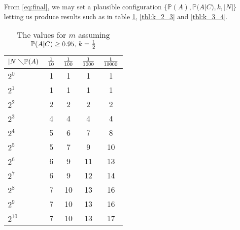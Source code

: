 \documentclass[11pt]{article}
\renewcommand{\P}{\mathbb{P}}
\begin{document}
    From \eqref{eq:final}, we may set a plausible configuration $\{\P(A),\P(A|C),k,|N|\}$ letting us
    produce results such as in table \ref{tbl:k_1_2}, \ref{tbl:k_2_3} and \ref{tbl:k_3_4}.

    \begin{table}[H]
        \centering
        \caption{The values for $m$ assuming $\P(A|C) \ge 0.95,\, k = {1 \over 2}$}
        \label{tbl:k_1_2}
        \begin{tabular}{lcccc}
            \toprule
            $|N| \diagdown \P(A)$ & ${1 \over 10 }$ & ${1 \over 100 }$ & ${1 \over 1000 }$ & ${1 \over 10000 }$\\
            \midrule
            $2^0$               & 1               & 1                & 1                 & 1\\
            $2^1$               & 1               & 1                & 1                 & 1\\
            $2^2$               & 2               & 2                & 2                 & 2\\
            $2^3$               & 4               & 4                & 4                 & 4\\
            $2^4$               & 5               & 6                & 7                 & 8\\
            $2^5$               & 5               & 7                & 9                 & 10\\
            $2^6$               & 6               & 9                & 11                & 13\\
            $2^7$               & 6               & 9                & 12                & 14\\
            $2^8$               & 7               & 10               & 13                & 16\\
            $2^9$               & 7               & 10               & 13                & 16\\
            $2^{10}$            & 7               & 10               & 13                & 17\\
            \bottomrule
        \end{tabular}
    \end{table}
\end{document}
